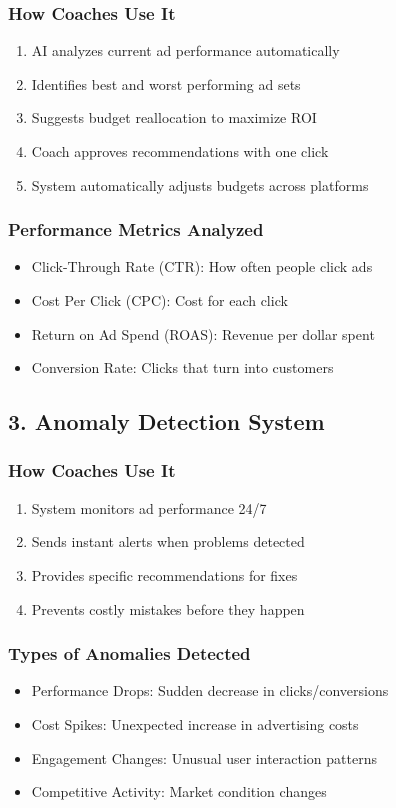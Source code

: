 \documentclass[12pt,a4paper]{article}
\begin{document}
\subsubsection{How Coaches Use It}
\begin{enumerate}
    \item AI analyzes current ad performance automatically
    \item Identifies best and worst performing ad sets
    \item Suggests budget reallocation to maximize ROI
    \item Coach approves recommendations with one click
    \item System automatically adjusts budgets across platforms
\end{enumerate}

\subsubsection{Performance Metrics Analyzed}
\begin{itemize}
    \item Click-Through Rate (CTR): How often people click ads
    \item Cost Per Click (CPC): Cost for each click
    \item Return on Ad Spend (ROAS): Revenue per dollar spent
    \item Conversion Rate: Clicks that turn into customers
\end{itemize}

\subsection{3. Anomaly Detection System}

\subsubsection{How Coaches Use It}
\begin{enumerate}
    \item System monitors ad performance 24/7
    \item Sends instant alerts when problems detected
    \item Provides specific recommendations for fixes
    \item Prevents costly mistakes before they happen
\end{enumerate}

\subsubsection{Types of Anomalies Detected}
\begin{itemize}
    \item Performance Drops: Sudden decrease in clicks/conversions
    \item Cost Spikes: Unexpected increase in advertising costs
    \item Engagement Changes: Unusual user interaction patterns
    \item Competitive Activity: Market condition changes
\end{itemize}
\end{document}
